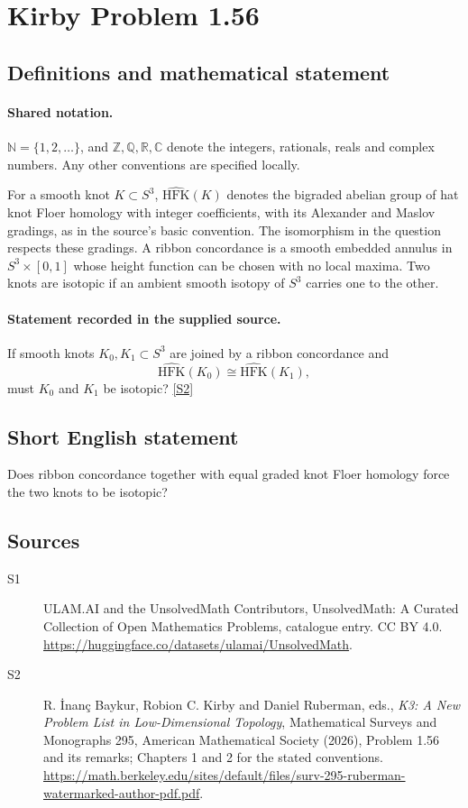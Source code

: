 \documentclass[11pt]{article}
\newcommand{\sref}[2]{\hyperlink{source:#1:#2}{[S#2]}}
\begin{document}
\section{Kirby Problem 1.56}\label{statement}

\subsection{Definitions and mathematical statement}

\paragraph{Shared notation.}$\mathbb N=\{1,2,\ldots\}$, and $\mathbb Z,\mathbb Q,\mathbb R,\mathbb C$ denote the integers, rationals, reals and complex numbers. Any other conventions are specified locally.


For a smooth knot $K\subset S^3$, $\widehat{\mathrm{HFK}}(K)$ denotes the bigraded abelian group of hat knot Floer homology with integer coefficients, with its Alexander and Maslov gradings, as in the source’s basic convention. The isomorphism in the question respects these gradings. A ribbon concordance is a smooth embedded annulus in $S^3\times[0,1]$ whose height function can be chosen with no local maxima. Two knots are isotopic if an ambient smooth isotopy of $S^3$ carries one to the other.
\paragraph{Statement recorded in the supplied source.}
If smooth knots $K_0,K_1\subset S^3$ are joined by a ribbon concordance and
\[\widehat{\mathrm{HFK}}(K_0)\cong\widehat{\mathrm{HFK}}(K_1),\]
must $K_0$ and $K_1$ be isotopic? \sref{statement}{2}

\subsection{Short English statement}
Does ribbon concordance together with equal graded knot Floer homology force the two knots to be isotopic?
\subsection{Sources}
\begin{description}
\item[\hypertarget{source:statement:1}{S1}] ULAM.AI and the UnsolvedMath Contributors, UnsolvedMath: A Curated Collection of Open Mathematics Problems, catalogue entry. CC BY 4.0. \url{https://huggingface.co/datasets/ulamai/UnsolvedMath}.
\item[\hypertarget{source:statement:2}{S2}] R. İnanç Baykur, Robion C. Kirby and Daniel Ruberman, eds., \emph{K3: A New Problem List in Low-Dimensional Topology}, Mathematical Surveys and Monographs 295, American Mathematical Society (2026), Problem 1.56 and its remarks; Chapters 1 and 2 for the stated conventions. \url{https://math.berkeley.edu/sites/default/files/surv-295-ruberman-watermarked-author-pdf.pdf}.
\end{description}
\label{end:statement}
\end{document}
